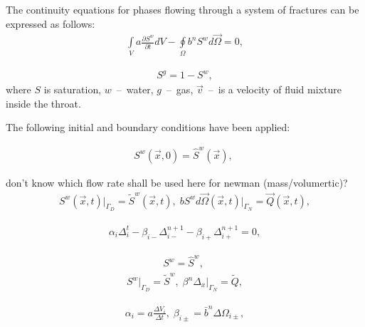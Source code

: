 \documentclass[a4paper,12pt]{extreport}
\begin{document}
  The continuity equations for phases flowing through a system of fractures can be expressed as follows:
  \begin{eqnarray}
  \label{eq:twophase_integral_w}
  \int \limits_{V} a \frac{\partial S^w}{\partial t} d V - \oint \limits_{\Omega} b^nS^w d\vec{\Omega} = 0,
  \end{eqnarray}
  
  \begin{eqnarray}
  \label{eq:twophase_integral_g}
  S^g = 1 - S^w,
  \end{eqnarray}
  where  $S$ is saturation, $w$~--~water, $g$~--~gas, $\vec{v}$~--~is a velocity of fluid mixture inside the throat. 
  
The following initial and boundary conditions have been applied:
  
  \begin{eqnarray}
  \label{eq:twophase_saturation_init}
  S^w\left(\vec{x}, \mathit{0}\right) = \hat{S}^w\left(\vec{x}\right), \; 
  \end{eqnarray}
  
  don't know which flow rate shall be used here for newman (mass/volumertic)?
  \begin{eqnarray}
  \label{eq:general_diffusivity_bound}
  S^w\left(\vec{x}, t\right)\Big|_{\mathit{\Gamma}_D} \!\!= \tilde{S}^w\left(\vec{x}, t\right), \; bS^w d\vec{\Omega} \left(\vec{x}, t\right)\Big|_{\mathit{\Gamma}_N} \!\!= \vec{Q}\left(\vec{x}, t\right),
  \end{eqnarray}
  
   \begin{eqnarray}
  \label{eq:twophase_num}
  \alpha_i \Delta^{t}_i - \beta_{i-}\Delta^{n+1}_{i-} - \beta_{i+}\Delta^{n+1}_{i+}= 0,
  \end{eqnarray}
  
      \begin{eqnarray}
  \label{eq:twophase_num_init}
  S^w = \hat{S}^w, \; 
  \end{eqnarray}
  \begin{eqnarray}
  \label{eq:twophase_num_bound}
  S^w \Big|_{\mathit{\Gamma}_D}= \tilde{S}^w, \; \beta^n\Delta_x \Big|_{\mathit{\Gamma}_N} = \tilde{Q},
  \end{eqnarray}
  
  \begin{eqnarray}
  \label{eq:twophase_alpha_beta}
  \alpha_i = a\frac{\Delta V_i}{\Delta t}, \;
  \beta_{i\pm} = \bar{b}^n\Delta \Omega_{i\pm},
  \end{eqnarray}
\end{document}
